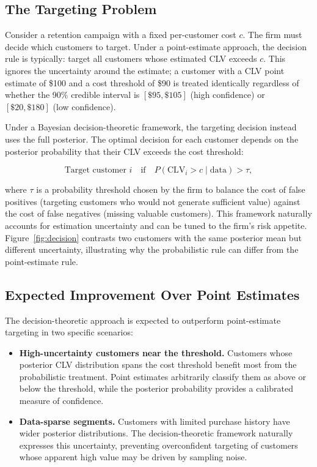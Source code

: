 \documentclass[12pt, a4paper, oneside]{report}
\begin{document}
\subsection{The Targeting Problem}
\label{sec:targeting}

Consider a retention campaign with a fixed per-customer cost $c$. The firm must decide which customers to target. Under a point-estimate approach, the decision rule is typically: target all customers whose estimated CLV exceeds $c$. This ignores the uncertainty around the estimate; a customer with a CLV point estimate of \$100 and a cost threshold of \$90 is treated identically regardless of whether the 90\% credible interval is $[\$95, \$105]$ (high confidence) or $[\$20, \$180]$ (low confidence).

Under a Bayesian decision-theoretic framework, the targeting decision instead uses the full posterior. The optimal decision for each customer depends on the posterior probability that their CLV exceeds the cost threshold:

\begin{equation}
  \text{Target customer } i \quad\text{if}\quad P(\text{CLV}_i > c \mid \text{data}) > \tau,
  \label{eq:decision-rule}
\end{equation}

where $\tau$ is a probability threshold chosen by the firm to balance the cost of false positives (targeting customers who would not generate sufficient value) against the cost of false negatives (missing valuable customers). This framework naturally accounts for estimation uncertainty and can be tuned to the firm's risk appetite. Figure~\ref{fig:decision} contrasts two customers with the same posterior mean but different uncertainty, illustrating why the probabilistic rule can differ from the point-estimate rule.



\subsection{Expected Improvement Over Point Estimates}
\label{sec:improvement}

The decision-theoretic approach is expected to outperform point-estimate targeting in two specific scenarios:

\begin{itemize}
  \item \textbf{High-uncertainty customers near the threshold.} Customers whose posterior CLV distribution spans the cost threshold benefit most from the probabilistic treatment. Point estimates arbitrarily classify them as above or below the threshold, while the posterior probability provides a calibrated measure of confidence.
  \item \textbf{Data-sparse segments.} Customers with limited purchase history have wider posterior distributions. The decision-theoretic framework naturally expresses this uncertainty, preventing overconfident targeting of customers whose apparent high value may be driven by sampling noise.
\end{itemize}
\end{document}

